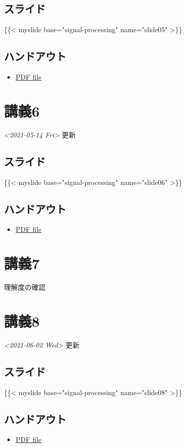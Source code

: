 \documentclass[11pt]{article}
\begin{document}
\subsection{スライド}
\label{sec:org98672d1}
\{\{< myslide base="signal-processing" name="slide05" >\}\}
\subsection{ハンドアウト}
\label{sec:org3180d15}
\begin{itemize}
\item \href{https://noboru-murata.github.io/signal-processing/pdfs/slide05.pdf}{PDF file}
\end{itemize}

\section{講義6}
\label{sec:orgbbc48bc}
\textit{<2021-05-14 Fri> } 更新
\subsection{スライド}
\label{sec:orge28c80b}
\{\{< myslide base="signal-processing" name="slide06" >\}\}
\subsection{ハンドアウト}
\label{sec:orgad04f31}
\begin{itemize}
\item \href{https://noboru-murata.github.io/signal-processing/pdfs/slide06.pdf}{PDF file}
\end{itemize}

\section{講義7}
\label{sec:orgadc47a3}
理解度の確認
\section{講義8}
\label{sec:org7679cba}
\textit{<2021-06-02 Wed> } 更新
\subsection{スライド}
\label{sec:org3abdb30}
\{\{< myslide base="signal-processing" name="slide08" >\}\}
\subsection{ハンドアウト}
\label{sec:org59b5896}
\begin{itemize}
\item \href{https://noboru-murata.github.io/signal-processing/pdfs/slide08.pdf}{PDF file}
\end{itemize}
\end{document}
